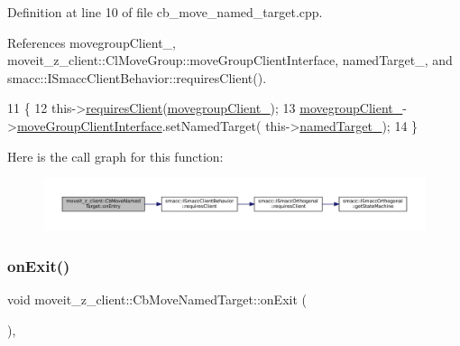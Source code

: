 Definition at line 10 of file cb\+\_\+move\+\_\+named\+\_\+target.\+cpp.



References movegroup\+Client\+\_\+, moveit\+\_\+z\+\_\+client\+::\+Cl\+Move\+Group\+::move\+Group\+Client\+Interface, named\+Target\+\_\+, and smacc\+::\+I\+Smacc\+Client\+Behavior\+::requires\+Client().


\begin{DoxyCode}
11 \{
12     this->\hyperlink{classsmacc_1_1ISmaccClientBehavior_a32b16e99e3b4cb289414203dc861a440}{requiresClient}(\hyperlink{classmoveit__z__client_1_1CbMoveNamedTarget_a1caf87b542890eb9181b04dc2271ef65}{movegroupClient\_});
13     \hyperlink{classmoveit__z__client_1_1CbMoveNamedTarget_a1caf87b542890eb9181b04dc2271ef65}{movegroupClient\_}->\hyperlink{classmoveit__z__client_1_1ClMoveGroup_af86e046b837be0ef4afa9893d8808f20}{moveGroupClientInterface}.setNamedTarget(
      this->\hyperlink{classmoveit__z__client_1_1CbMoveNamedTarget_a84a8aadc460b4a68eae22d25479c2bce}{namedTarget\_});
14 \}
\end{DoxyCode}
Here is the call graph for this function\+:
\nopagebreak
\begin{figure}[H]
\begin{center}
\leavevmode
\includegraphics[width=350pt]{classmoveit__z__client_1_1CbMoveNamedTarget_ad84bcf4ea514c0cdc3550ca41ff77d69_cgraph}
\end{center}
\end{figure}
\mbox{\label{classmoveit__z__client_1_1CbMoveNamedTarget_ab91985b232e1185b4b102bb309f65ffc}} 
\subsubsection{\texorpdfstring{on\+Exit()}{onExit()}}
{\footnotesize\ttfamily void moveit\+\_\+z\+\_\+client\+::\+Cb\+Move\+Named\+Target\+::on\+Exit (\begin{DoxyParamCaption}{ }\end{DoxyParamCaption})\hspace{0.3cm}{\ttfamily [override]}, {\ttfamily [virtual]}}



